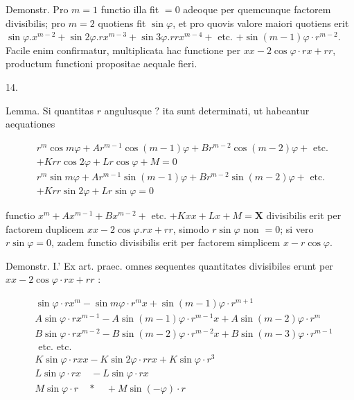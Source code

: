 \documentclass[10pt]{article}
\begin{document}
Demonstr. Pro \(m=1\) functio illa fit \(=0\) adeoque per quemcunque factorem divisibilis; pro \(m=2\) quotiens fit \(\sin \varphi\), et pro quovis valore maiori quotiens erit \(\sin \varphi . x^{m-2}+\sin 2 \varphi . r x^{m-3}+\sin 3 \varphi . r r x^{m-4}+\) etc. \(+\sin (m-1) \varphi \cdot r^{m-2}\). Facile enim confirmatur, multiplicata hac functione per \(x x-2 \cos \varphi \cdot r x+r r\), productum functioni propositae aequale fieri.

14.

Lemma. Si quantitas \(r\) angulusque \(?\) ita sunt determinati, ut habeantur aequationes

\[
\begin{aligned}
& r^{m} \cos m \varphi+A r^{m-1} \cos (m-1) \varphi+B r^{m-2} \cos (m-2) \varphi+\text { etc. } \\
&+K r r \cos 2 \varphi+L r \cos \varphi+M=0 \\
& r^{m} \sin m \varphi+A r^{m-1} \sin (m-1) \varphi+B r^{m-2} \sin (m-2) \varphi+\text { etc. } \\
&+K r r \sin 2 \varphi+L r \sin \varphi=0
\end{aligned}
\]

functio \(x^{m}+A x^{m-1}+B x^{m-2}+\) etc. \(+K x x+L x+M=\mathbf{X}\) divisibilis erit per factorem duplicem \(x x-2 \cos \varphi . r x+r r\), simodo \(r \sin \varphi\) non \(=0\); si vero \(r \sin \varphi=0\), zadem functio divisibilis erit per factorem simplicem \(x-r \cos \varphi\).

Demonstr. I.' Ex art. praec. omnes sequentes quantitates divisibiles erunt per \(x x-2 \cos \varphi \cdot r x+r r\) :

\[
\begin{aligned}
& \sin \varphi \cdot r x^{m}-\sin m \varphi \cdot r^{m} x+\sin (m-1) \varphi \cdot r^{m+1} \\
& A \sin \varphi \cdot r x^{m-1}-A \sin (m-1) \varphi \cdot r^{m-1} x+A \sin (m-2) \varphi \cdot r^{m} \\
& B \sin \varphi \cdot r x^{m-2}-B \sin (m-2) \varphi \cdot r^{m-2} x+B \sin (m-3) \varphi \cdot r^{m-1} \\
& \text { etc. etc. } \\
& K \sin \varphi \cdot r x x-K \sin 2 \varphi \cdot r r x+K \sin \varphi \cdot r^{3} \\
& L \sin \varphi \cdot r x \quad-L \sin \varphi \cdot r x \\
& M \sin \varphi \cdot r \quad * \quad+M \sin (-\varphi) \cdot r
\end{aligned}
\]
\end{document}
